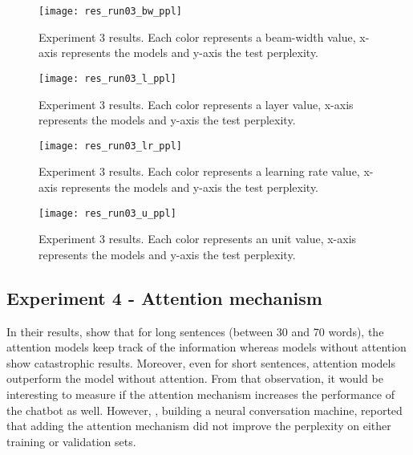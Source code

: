 \begin{landscape}
\begin{figure}
    \centering
    \texttt{[image: res\_run03\_bw\_ppl]}
    \decoRule
    \caption[Results experiment 3 BW-PPL]{Experiment 3 results. Each color represents a beam-width value, x-axis represents the models and y-axis the test perplexity.}
    \label{fig:res_run03_bw_ppl}
\end{figure}
\begin{figure}
    \centering
    \texttt{[image: res\_run03\_l\_ppl]}
    \decoRule
    \caption[Results experiment 3 L-PPL]{Experiment 3 results. Each color represents a layer value, x-axis represents the models and y-axis the test perplexity.}
    \label{fig:res_run03_l_ppl}
\end{figure}
\begin{figure}
    \centering
    \texttt{[image: res\_run03\_lr\_ppl]}
    \decoRule
    \caption[Results experiment 3 LR-PPL]{Experiment 3 results. Each color represents a learning rate value, x-axis represents the models and y-axis the test perplexity.}
    \label{fig:res_run03_lr_ppl}
\end{figure}
\begin{figure}
    \centering
    \texttt{[image: res\_run03\_u\_ppl]}
    \decoRule
    \caption[Results experiment 3 U-PPL]{Experiment 3 results. Each color represents an unit value, x-axis represents the models and y-axis the test perplexity.}
    \label{fig:res_run03_u_ppl}
\end{figure}
\end{landscape}

\subsection{Experiment 4 - Attention mechanism}
In their results, \citet{1508.04025} show that for long sentences (between 30 and 70 words), the attention models keep track of the information whereas models without attention show catastrophic results. Moreover, even for short sentences, attention models outperform the model without attention. From that observation, it would be interesting to measure if the attention mechanism increases the performance of the chatbot as well. However, \citet{1506.05869}, building a neural conversation machine, reported that adding the attention mechanism \citep{1409.0473} did not improve the perplexity on either training or validation sets.

